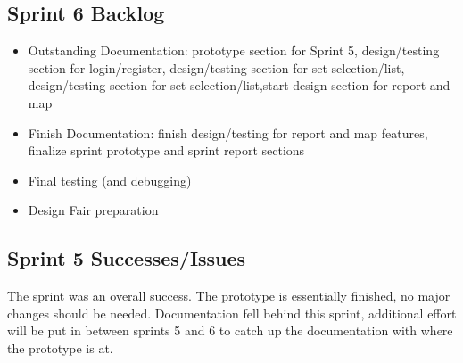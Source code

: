 \subsection{Sprint 6 Backlog}
\begin{itemize}
\item Outstanding Documentation: prototype section for Sprint 5, design/testing section for login/register, design/testing section for set selection/list, design/testing section for set selection/list,start design section for report and map
\item Finish Documentation: finish design/testing for report and map features, finalize sprint prototype and sprint report sections
\item Final testing (and debugging)
\item Design Fair preparation
\end{itemize}

\subsection{Sprint 5 Successes/Issues}
The sprint was an overall success.  The prototype is essentially finished, no major changes should be needed. Documentation fell behind this sprint, additional effort will be put in between sprints 5 and 6 to catch up the documentation with where the prototype is at.